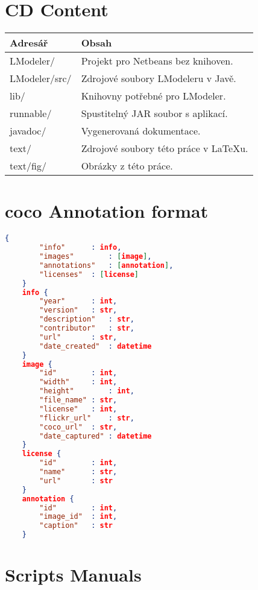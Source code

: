 \chapter{CD Content}


\begin{table}[h]
	\centering
	\renewcommand{\arraystretch}{1.2}
	\begin{tabular}{|l|l|}
		\hline
		Adresář & Obsah  \\
		\hline
		\hline
		LModeler/ & Projekt pro Netbeans bez knihoven. \\
		LModeler/src/ & Zdrojové soubory LModeleru v Javě. \\
		lib/ & Knihovny potřebné pro LModeler. \\
		runnable/ & Spustitelný JAR soubor s aplikací.\\
		javadoc/ & Vygenerovaná dokumentace. \\
		text/ & Zdrojové soubory této práce v LaTeXu. \\
		text/fig/ & Obrázky z této práce. \\
		\hline
	\end{tabular}
	\label{tab:cdcontent}
\end{table}

\chapter{\gls{coco} Annotation format} \label{chp:jsonAnnotation}
\begin{lstlisting}[language=json,firstnumber=1]
	{
		"info"		: info,
		"images"		: [image],
		"annotations"	: [annotation],
		"licenses"	: [license]
	}
	info {
		"year"		: int,
		"version"	: str,
		"description"	: str,
		"contributor"	: str,
		"url"		: str,
		"date_created"	: datetime
	}
	image {
		"id"		: int,
		"width"		: int,
		"height"		: int,
		"file_name"	: str,
		"license"	: int,
		"flickr_url"	: str,
		"coco_url"	: str,
		"date_captured"	: datetime
	}
	license {
		"id"		: int,
		"name"		: str,
		"url"		: str
	}
	annotation {
		"id"		: int,
		"image_id"	: int,
		"caption"	: str
	}
\end{lstlisting}

\chapter{Scripts Manuals}



